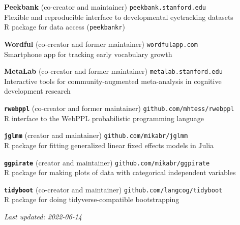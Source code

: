 \documentclass[11pt,]{article}
\begin{document}
\textbf{Peekbank} (co-creator and maintainer)
\hfill \texttt{peekbank.stanford.edu}\\
\hspace*{0.333em}\hspace*{0.333em}\hspace*{0.333em}Flexible and
reproducible interface to developmental eyetracking datasets \\
\hspace*{0.333em}\hspace*{0.333em}\hspace*{0.333em}R package for data
access (\texttt{peekbankr})

\textbf{Wordful} (co-creator and former maintainer)
\hfill \texttt{wordfulapp.com}\\
\hspace*{0.333em}\hspace*{0.333em}\hspace*{0.333em}Smartphone app for
tracking early vocabulary growth

\textbf{MetaLab} (co-creator and former maintainer)
\hfill \texttt{metalab.stanford.edu}\\
\hspace*{0.333em}\hspace*{0.333em}\hspace*{0.333em}Interactive tools for
community-augmented meta-analysis in cognitive development research

\textbf{\texttt{rwebppl}} (co-creator and former maintainer)
\hfill \texttt{github.com/mhtess/rwebppl}\\
\hspace*{0.333em}\hspace*{0.333em}\hspace*{0.333em}R interface to the
WebPPL probabilistic programming language

\textbf{\texttt{jglmm}} (creator and maintainer)
\hfill \texttt{github.com/mikabr/jglmm}\\
\hspace*{0.333em}\hspace*{0.333em}\hspace*{0.333em}R package for fitting
generalized linear fixed effects models in Julia

\textbf{\texttt{ggpirate}} (creator and maintainer)
\hfill \texttt{github.com/mikabr/ggpirate}\\
\hspace*{0.333em}\hspace*{0.333em}\hspace*{0.333em}R package for making
plots of data with categorical independent variables

\textbf{\texttt{tidyboot}} (co-creator and maintainer)
\hfill \texttt{github.com/langcog/tidyboot}\\
\hspace*{0.333em}\hspace*{0.333em}\hspace*{0.333em}R package for doing
tidyverse-compatible bootstrapping

\centering
\vspace{2em}

\emph{Last updated: 2022-06-14}
\end{document}
